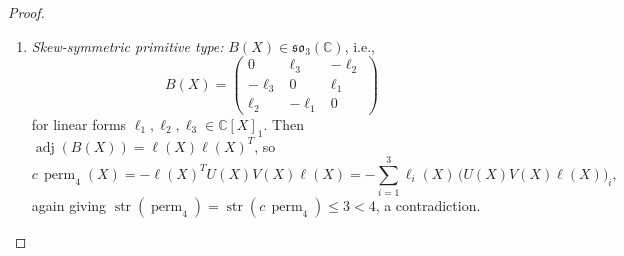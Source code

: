 \documentclass[11pt,a4paper]{article}
\theoremstyle{definition}
\DeclareMathOperator{\perm}{perm}
\DeclareMathOperator{\str}{str}
\DeclareMathOperator{\adj}{adj}
\begin{document}
\begin{proof}
\begin{enumerate}
\[    q(X) := \begin{pmatrix} 0 \\ b_{31}(X) \\ -b_{21}(X) \end{pmatrix}.
  \]
  Consequently,
  \[
    c\,\perm_4(X) = -q(X)^T U(X) V(X) p(X)
    = -b_{31}(X)\big(U(X)V(X)p(X)\big)_2 + b_{21}(X)\big(U(X)V(X)p(X)\big)_3,
  \]
  which gives $\str(\perm_4) = \str(c\,\perm_4) \le 2 < 4$, a contradiction.
  \item \emph{Skew-symmetric primitive type:} $B(X) \in \mathfrak{so}_3(\mathbb{C})$, i.e.,
  \[
    B(X) = \begin{pmatrix} 0 & \ell_3 & -\ell_2 \\ -\ell_3 & 0 & \ell_1 \\ \ell_2 & -\ell_1 & 0 \end{pmatrix}
  \]
  for linear forms $\ell_1,\ell_2,\ell_3 \in \mathbb{C}[X]_1$. Then $\adj(B(X)) = \ell(X)\ell(X)^T$, so
  \[
    c\,\perm_4(X) = -\ell(X)^T U(X) V(X) \ell(X) = -\sum_{i=1}^3 \ell_i(X)\, \big(U(X) V(X) \ell(X)\big)_i,
  \]
  again giving $\str(\perm_4) = \str(c\,\perm_4) \le 3 < 4$, a contradiction.
\end{enumerate}


\end{proof}
\end{document}
